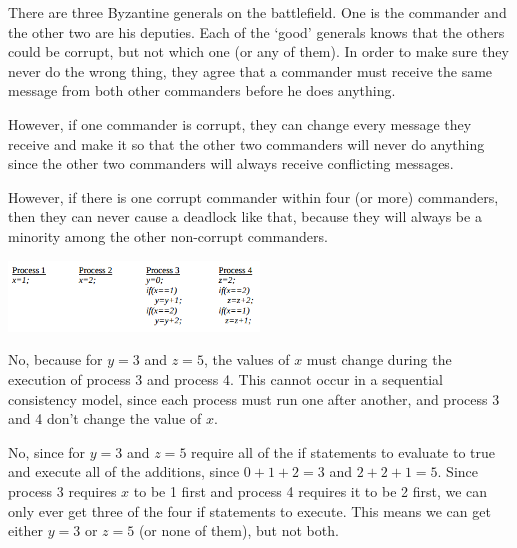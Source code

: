 There are three Byzantine generals on the battlefield. One is the commander and
the other two are his deputies. Each of the `good' generals knows that the
others could be corrupt, but not which one (or any of them). In order to make
sure they never do the wrong thing, they agree that a commander must receive the
same message from both other commanders before he does anything.

However, if one commander is corrupt, they can change every message they receive
and make it so that the other two commanders will never do anything since the
other two commanders will always receive conflicting messages.

However, if there is one corrupt commander within four (or more) commanders,
then they can never cause a deadlock like that, because they will always be a
minority among the other non-corrupt commanders.


\begin{center}
  \includegraphics[width=0.5\textwidth]{images/2012-2-d}
\end{center}


No, because for $y=3$ and $z=5$, the values of $x$ must change during the
execution of process 3 and process 4. This cannot occur in a sequential
consistency model, since each process must run one after another, and process 3
and 4 don't change the value of $x$.


No, since for $y=3$ and $z=5$ require all of the if statements to evaluate to
true and execute all of the additions, since $0 + 1 + 2 = 3$ and $2 + 2 + 1 =
5$. Since process 3 requires $x$ to be 1 first and process 4 requires it to be 2
first, we can only ever get three of the four if statements to execute. This
means we can get either $y=3$ or $z=5$ (or none of them), but not both.

